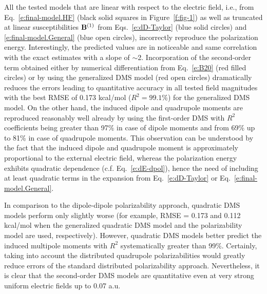 \documentclass[aip,amsmath,amssymb,reprint,floatfix]{revtex4-1}
\begin{document}
All the tested models that are linear with respect to the electric field,
i.e., from Eq.~\eqref{e:final-model.HF} (black solid squares in Figure~\ref{f:fig-1}) 
as well as truncated at linear susceptibilities ${\bf B}^{(1)}$ 
from Eqs.~\eqref{e:dD-Taylor} (blue solid circles) and \eqref{e:final-model.General} (blue open circles),
incorrectly reproduce the polarization energy.
Interestingly, the predicted values are in noticeable 
and same correlation with the exact estimates with a slope of $\sim$2.
Incorporation of the second\hyp{}order term
obtained either by numerical differentiation from Eq.~\eqref{e:B20} (red filled circles) 
or by using the generalized DMS model (red open circles)
dramatically reduces the errors
leading to quantitative accuracy in all tested field magnitudes 
with the best RMSE of 0.173 kcal/mol ($R^2=99.1\%$) for the generalized DMS model.
On the other hand, the
induced dipole and quadrupole moments are reproduced reasonably well already by
using the first\hyp{}order DMS with $R^2$ coefficients being 
greater than 97\% in case of dipole moments and from 69\% up to 81\% in case of quadrupole moments.
This observation can be understood by the fact that the induced dipole
and quadrupole moment is approximately proportional to the external electric field, whereas the polarization
energy exhibits quadratic dependence (c.f. Eq.~\eqref{e:dE-dpol}), hence the need of including at least
quadratic terms in the expansion from Eq.~\eqref{e:dD-Taylor} or Eq.~\eqref{e:final-model.General}. 

In comparison to the dipole\hyp{}dipole polarizability approach, 
quadratic DMS models perform only slightly worse 
(for example, RMSE = 0.173 and 0.112 kcal/mol when the generalized quadratic DMS
model and the polarizability model are used, respectively).
However, quadratic DMS models better predict the induced multipole moments with
$R^2$ systematically greater than 99\%. 
Certainly, taking into account the distributed quadrupole polarizabilities
would greatly reduce errors of the standard distributed polarizability approach.
Nevertheless, it is clear that the second\hyp{}order
DMS models are quantitative even at very strong uniform electric fields up to 0.07 a.u.
\end{document}
